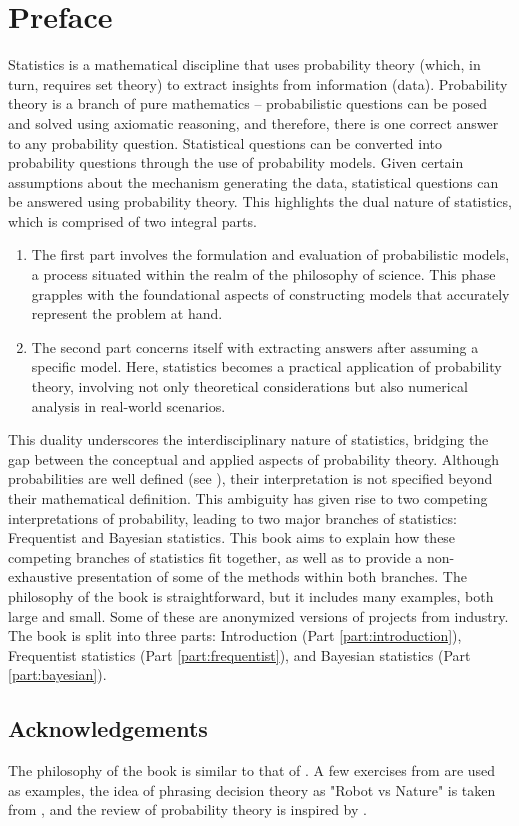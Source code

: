 \chapter{Preface}
\label{chp:preface}
Statistics is a mathematical discipline that uses probability theory (which, in turn, requires set theory) to extract insights from information (data). Probability theory is a branch of pure mathematics -- probabilistic questions can be posed and solved using axiomatic reasoning, and therefore, there is one correct answer to any probability question. Statistical questions can be converted into probability questions through the use of probability models. Given certain assumptions about the mechanism generating the data, statistical questions can be answered using probability theory. This highlights the dual nature of statistics, which is comprised of two integral parts.
\begin{enumerate}
	\item The first part involves the formulation and evaluation of probabilistic models, a process situated within the realm of the philosophy of science. This phase grapples with the foundational aspects of constructing models that accurately represent the problem at hand.
	\item The second part concerns itself with extracting answers after assuming a specific model. Here, statistics becomes a practical application of probability theory, involving not only theoretical considerations but also numerical analysis in real-world scenarios.
\end{enumerate}
This duality underscores the interdisciplinary nature of statistics, bridging the gap between the conceptual and applied aspects of probability theory. Although probabilities are well defined (see ), their interpretation is not specified beyond their mathematical definition. This ambiguity has given rise to two competing interpretations of probability, leading to two major branches of statistics: Frequentist and Bayesian statistics. This book aims to explain how these competing branches of statistics fit together, as well as to provide a non-exhaustive presentation of some of the methods within both branches. The philosophy of the book is straightforward, but it includes many examples, both large and small. Some of these are anonymized versions of projects from industry. The book is split into three parts: Introduction (Part \ref{part:introduction}), Frequentist statistics (Part \ref{part:frequentist}), and Bayesian statistics (Part \ref{part:bayesian}).


\section{Acknowledgements}
The philosophy of the book is similar to that of \cite{Sivia2006}. A few exercises from \cite{murphy2023probabilistic} are used as examples, the idea of phrasing decision theory as "Robot vs Nature" is taken from \cite{lavalle2006planning}, and the review of probability theory is inspired by \cite{chan2021introduction}.